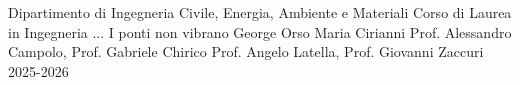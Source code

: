 \frontespizio
    {Dipartimento di Ingegneria Civile, Energia, Ambiente e Materiali}
    {Corso di Laurea in Ingegneria ...}
    {I ponti non vibrano}
    {George Orso Maria Cirianni}
    {Prof. Alessandro Campolo, Prof. Gabriele Chirico}
    {Prof. Angelo Latella, Prof. Giovanni Zaccuri}
    {2025-2026}

